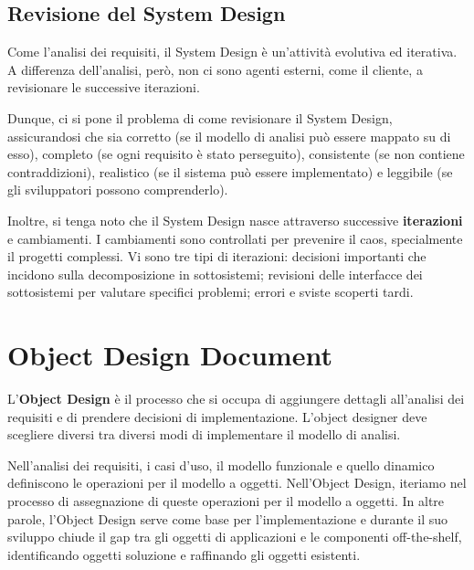 \documentclass{article}
\begin{document}
    \subsection{Revisione del System Design}
    
        Come l'analisi dei requisiti, il System Design è un'attività evolutiva ed iterativa. A differenza dell'analisi, però, non ci sono agenti esterni, come il cliente, a revisionare le successive iterazioni. 
        
        Dunque, ci si pone il problema di come revisionare il System Design, assicurandosi che sia corretto (se il modello di analisi può essere mappato su di esso), completo (se ogni requisito è stato perseguito), consistente (se non contiene contraddizioni), realistico (se il sistema può essere implementato) e leggibile (se gli sviluppatori possono comprenderlo).
        
        \vspace{3mm}
        
        Inoltre, si tenga noto che il System Design nasce attraverso successive \textbf{iterazioni} e cambiamenti. I cambiamenti sono controllati per prevenire il caos, specialmente il progetti complessi. Vi sono tre tipi di iterazioni: decisioni importanti che incidono sulla decomposizione in sottosistemi; revisioni delle interfacce dei sottosistemi per valutare specifici problemi; errori e sviste scoperti tardi.
    
\section{Object Design Document}
    L'\textbf{Object Design} è il processo che si occupa di aggiungere dettagli all'analisi dei requisiti e di prendere decisioni di implementazione. L'object designer deve scegliere diversi tra diversi modi di implementare il modello di analisi.
    
    \vspace{3mm}
    
    Nell'analisi dei requisiti, i casi d'uso, il modello funzionale e quello dinamico definiscono le operazioni per il modello a oggetti. Nell'Object Design, iteriamo nel processo di assegnazione di queste operazioni per il modello a oggetti. In altre parole, l'Object Design serve come base per l'implementazione e durante il suo sviluppo chiude il gap tra gli oggetti di applicazioni e le componenti off-the-shelf, identificando oggetti soluzione e raffinando gli oggetti esistenti.
    
\end{document}
